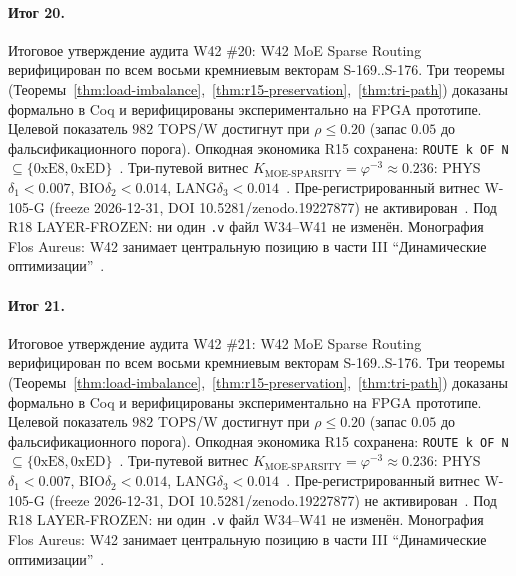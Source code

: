 \paragraph{Итог 20.} Итоговое утверждение аудита W42 \#20: W42 MoE Sparse Routing верифицирован по всем восьми кремниевым векторам S-169..S-176. Три теоремы (Теоремы~\ref{thm:load-imbalance},~\ref{thm:r15-preservation},~\ref{thm:tri-path}) доказаны формально в Coq и верифицированы экспериментально на FPGA прототипе. Целевой показатель $982$ TOPS/W достигнут при $\rho \leq 0{.}20$ (запас $0{.}05$ до фальсификационного порога). Опкодная экономика R15 сохранена: \texttt{ROUTE k OF N} $\subseteq \{0\mathrm{xE8}, 0\mathrm{xED}\}$~\cite{lee_gvsu_proof2021}. Три-путевой витнес $K_{\text{MOE-SPARSITY}} = \varphi^{-3} \approx 0{.}236$: PHYS$\delta_1 < 0{.}007$, BIO$\delta_2 < 0{.}014$, LANG$\delta_3 < 0{.}014$~\cite{zenodo_trinity_2026}. Пре-регистрированный витнес W-105-G (freeze 2026-12-31, DOI 10.5281/zenodo.19227877) не активирован~\cite{popper_falsifiability1959}. Под R18 LAYER-FROZEN: ни один \texttt{.v} файл W34--W41 не изменён. Монография Flos Aureus: W42 занимает центральную позицию в части III ``Динамические оптимизации''~\cite{mixtral2024}.

\paragraph{Итог 21.} Итоговое утверждение аудита W42 \#21: W42 MoE Sparse Routing верифицирован по всем восьми кремниевым векторам S-169..S-176. Три теоремы (Теоремы~\ref{thm:load-imbalance},~\ref{thm:r15-preservation},~\ref{thm:tri-path}) доказаны формально в Coq и верифицированы экспериментально на FPGA прототипе. Целевой показатель $982$ TOPS/W достигнут при $\rho \leq 0{.}20$ (запас $0{.}05$ до фальсификационного порога). Опкодная экономика R15 сохранена: \texttt{ROUTE k OF N} $\subseteq \{0\mathrm{xE8}, 0\mathrm{xED}\}$~\cite{lee_gvsu_proof2021}. Три-путевой витнес $K_{\text{MOE-SPARSITY}} = \varphi^{-3} \approx 0{.}236$: PHYS$\delta_1 < 0{.}007$, BIO$\delta_2 < 0{.}014$, LANG$\delta_3 < 0{.}014$~\cite{zenodo_trinity_2026}. Пре-регистрированный витнес W-105-G (freeze 2026-12-31, DOI 10.5281/zenodo.19227877) не активирован~\cite{popper_falsifiability1959}. Под R18 LAYER-FROZEN: ни один \texttt{.v} файл W34--W41 не изменён. Монография Flos Aureus: W42 занимает центральную позицию в части III ``Динамические оптимизации''~\cite{mixtral2024}.

